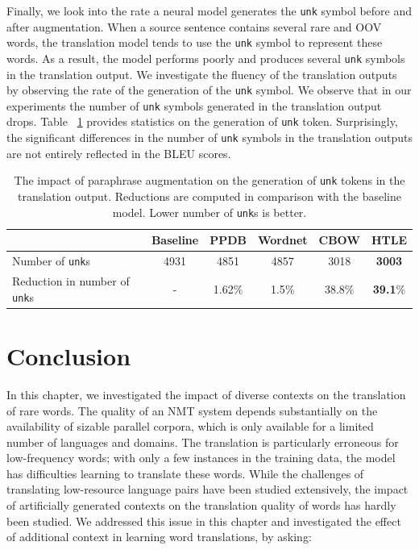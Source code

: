 Finally, we look into the rate a neural model generates the \texttt{unk} symbol before and after augmentation.
When a source sentence contains several rare and OOV words, the translation model tends to use the \texttt{unk} symbol to represent these words. 
As a result, the model performs poorly and produces several \texttt{unk} symbols in the translation output.
We investigate the fluency of the translation outputs by observing the rate of the generation of the \texttt{unk} symbol.
We observe that in our experiments the number of \texttt{unk} symbols generated in the translation output drops. 
Table ~\ref{unkaveaug} provides statistics on the generation of  \texttt{unk} token. 
Surprisingly, the significant differences in the number of \texttt{unk} symbols in the translation outputs are not entirely reflected in the BLEU scores. 

\begin{table}
\centering
\caption{The impact of paraphrase augmentation on the generation of \texttt{unk} tokens in the translation output. Reductions are computed in comparison with the baseline model. Lower number of \texttt{unk}s is better.  \label{unkaveaug} }
\begin{tabular}{l|c|cccc}
& Baseline & PPDB & Wordnet & CBOW & HTLE \\ \midrule
Number of \texttt{unk}s & 4931 & 4851 & 4857 & 3018 & \bf 3003 \\
Reduction in number of \texttt{unk}s & - & 1.62$\%$ & 1.5$\%$ & 38.8$\%$ & \bf 39.1$\%$ \\
\end{tabular}
\end{table}


\section{Conclusion} \label{tda:conc}

In this chapter, we investigated the impact of diverse contexts on the translation of rare words.
The quality of an NMT system depends substantially on the availability of sizable parallel corpora, which is only available for a limited number of languages and domains.
The translation is particularly erroneous for low-frequency words; with only a few instances in the training data, the model has difficulties learning to translate these words. 
While the challenges of translating low-resource language pairs have been studied extensively, the impact of artificially generated contexts on the translation quality of words has hardly been studied. 
We addressed this issue in this chapter and investigated the effect of additional context in learning word translations, by asking:
 
